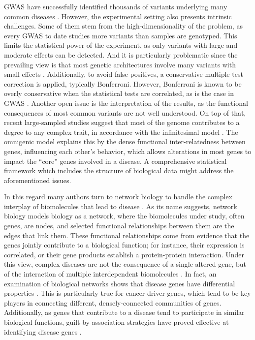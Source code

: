 \documentclass[twocolumn, 10pt]{article}
\begin{document}
GWAS have successfully identified thousands of variants underlying many common diseases \cite{buniello_nhgri-ebi_2019}. However, the experimental setting also presents intrinsic challenges. Some of them stem from the high-dimensionality of the problem, as every GWAS to date studies more variants than samples are genotyped. This limits the statistical power of the experiment, as only variants with large and moderate effects can be detected. And it is particularly problematic since the prevailing view is that most genetic architectures involve many variants with small effects \cite{visscher_10_2017}. Additionally, to avoid false positives, a conservative multiple test correction is applied, typically Bonferroni. However, Bonferroni is known to be overly conservative when the statistical tests are correlated, as is the case in GWAS \cite{wang_statistical_2018}. Another open issue is the interpretation of the results, as the functional consequences of most common variants are not well understood. On top of that, recent large-sampled studies suggest that most of the genome contributes to a degree to any complex trait, in accordance with the infinitesimal model \cite{barton_infinitesimal_2017}. The omnigenic model \cite{boyle_expanded_2017} explains this by the dense functional inter-relatedness between genes, influencing each other's behavior, which allows alterations in most genes to impact the ``core'' genes involved in a disease. A comprehensive statistical framework which includes the structure of biological data might address the aforementioned issues.

In this regard many authors turn to network biology to handle the complex interplay of biomolecules that lead to disease \cite{furlong_human_2013}. As its name suggests, network biology models biology as a network, where the biomolecules under study, often genes, are nodes, and selected functional relationships between them are the edges that link them. These functional relationships come from evidence that the genes jointly contribute to a biological function; for instance, their expression is correlated, or their gene products establish a protein-protein interaction. Under this view, complex diseases are not the consequence of a single altered gene, but of the interaction of multiple interdependent biomolecules \cite{barabasi_network_2011}. In fact, an examination of biological networks shows that disease genes have differential properties \cite{barabasi_network_2011} \cite{pinero_uncovering_2016}. This is particularly true for cancer driver genes, which tend to be key players in connecting different, densely-connected communities of genes. Additionally, as genes that contribute to a disease tend to participate in similar biological functions, guilt-by-association strategies have proved effective at identifying disease genes \cite{huang_systematic_2018}. 
\end{document}
